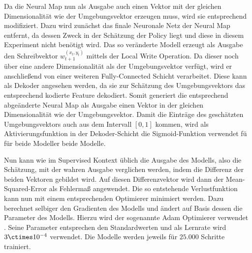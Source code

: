 Da die Neural Map nun als Ausgabe auch einen Vektor mit der gleichen Dimensionalität wie der Umgebungsvektor erzeugen muss, wird sie entsprechend modifiziert. Dazu wird zunächst das finale Neuronale Netz der Neural Map entfernt, da dessen Zweck in der Schätzung der Policy liegt und diese in diesem Experiment nicht benötigt wird. Das so veränderte Modell erzeugt als Ausgabe den Schreibvektor $w_{t+1}^{(x_t,y_t)}$ mittels der Local Write Operation. Da dieser noch über eine andere Dimensionalität als der Umgebungsvektor verfügt, wird er anschließend von einer weiteren Fully-Connected Schicht verarbeitet. Diese kann als Dekoder angesehen werden, da sie zur Schätzung des Umgebungsvektors das entsprechend kodierte Feature dekodiert. Somit generiert die entsprechend abgeänderte Neural Map als Ausgabe einen Vektor in der gleichen Dimensionalität wie der Umgebungsvektor. Damit die Einträge des geschätzten Umgebungsvektors auch aus dem Intervall $[0, 1]$ kommen, wird als Aktivierungsfunktion in der Dekoder-Schicht die Sigmoid-Funktion verwendet fü für beide Modeller beide Modelle.

Nun kann wie im Supervised Kontext üblich die Ausgabe des Modells, also die Schätzung, mit der wahren Ausgabe verglichen werden, indem die Differenz der beiden Vektoren gebildet wird. Auf diesen Differenzvektor wird dann der Mean-Squared-Error als Fehlermaß angewendet. Die so entstehende Verlustfunktion kann nun mit einem entsprechenden Optimierer minimiert werden. Dazu berechnet selbiger den Gradienten des Modells und ändert auf Basis dessen die Parameter des Modells. Hierzu wird der sogenannte Adam Optimierer verwendet \cite{Adam}. Seine Parameter entsprechen den Standardwerten und als Lernrate wird $3\ctimes10^{-4}$ verwendet. Die Modelle werden jeweils für $25.000$ Schritte trainiert.

